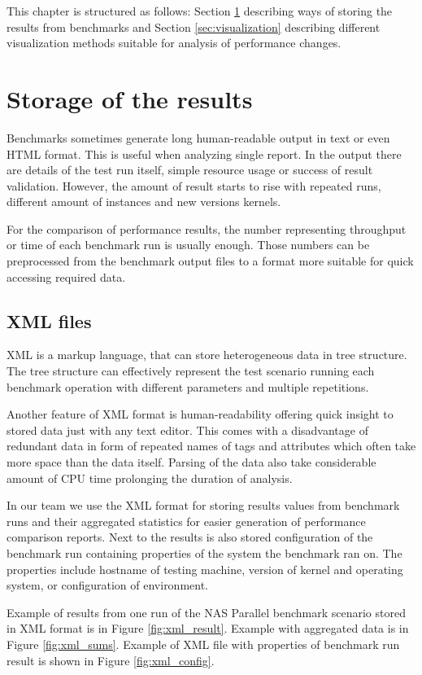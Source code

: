 This chapter is structured as follows: Section \ref{sec:storage} describing
ways of storing the results from benchmarks and Section \ref{sec:visualization}
describing different visualization methods suitable for analysis of performance
changes.

\section{Storage of the results} \label{sec:storage}
Benchmarks sometimes generate long human-readable output in text or even HTML
format. This is useful when analyzing single report. In the output there are details
of the test run itself, simple resource usage or success of result validation.
However, the amount of result starts to rise with repeated runs, different
amount of instances and new versions kernels.

For the comparison of performance results, the number representing throughput or
time of each benchmark run is usually enough. Those numbers can be preprocessed
from the benchmark output files to a format more suitable for quick accessing
required data.

\subsection{XML files}
XML is a markup language, that can store heterogeneous data in tree structure.
The tree structure can effectively represent the test scenario running each
benchmark operation with different parameters and multiple repetitions.

Another feature of XML format is human-readability offering quick insight to stored
data just with any text editor.
This comes with a disadvantage of redundant data in form of repeated names of
tags and attributes which often take more space than the data itself. Parsing of
the data also take considerable amount of CPU time prolonging the duration of
analysis.

In our team we use the XML format for storing results values from benchmark runs
and their aggregated statistics for easier generation of performance comparison
reports. Next to the results is also stored configuration of the benchmark run
containing properties of the system the benchmark ran on. The properties include
hostname of testing machine, version of kernel and operating system, or
configuration of environment.

Example of results from one run of the NAS Parallel benchmark scenario stored in
XML format is in Figure \ref{fig:xml_result}. Example with aggregated
data is in Figure \ref{fig:xml_sums}. Example of XML file with properties
of benchmark run result is shown in Figure \ref{fig:xml_config}.

